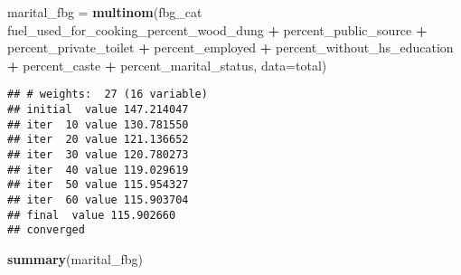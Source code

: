 \documentclass[]{article}
\newenvironment{Shaded}{\begin{snugshade}}{\end{snugshade}}
\newcommand{\DataTypeTok}[1]{\textcolor[rgb]{0.13,0.29,0.53}{#1}}
\newcommand{\KeywordTok}[1]{\textcolor[rgb]{0.13,0.29,0.53}{\textbf{#1}}}
\newcommand{\NormalTok}[1]{#1}
\newcommand{\OperatorTok}[1]{\textcolor[rgb]{0.81,0.36,0.00}{\textbf{#1}}}
\newcommand{\StringTok}[1]{\textcolor[rgb]{0.31,0.60,0.02}{#1}}
\begin{document}
\begin{Shaded}
\begin{Highlighting}[]
\NormalTok{marital_fbg =}\StringTok{ }
\StringTok{  }\KeywordTok{multinom}\NormalTok{(fbg_cat }\OperatorTok{~}\StringTok{ }\NormalTok{fuel_used_for_cooking_percent_wood_dung }\OperatorTok{+}\StringTok{ }\NormalTok{percent_public_source }\OperatorTok{+}\StringTok{ }\NormalTok{percent_private_toilet }\OperatorTok{+}\StringTok{ }\NormalTok{percent_employed }\OperatorTok{+}\StringTok{ }\NormalTok{percent_without_hs_education }\OperatorTok{+}\StringTok{ }\NormalTok{percent_caste }\OperatorTok{+}\StringTok{ }\NormalTok{percent_marital_status, }\DataTypeTok{data=}\NormalTok{total)}
\end{Highlighting}
\end{Shaded}

\begin{verbatim}
## # weights:  27 (16 variable)
## initial  value 147.214047 
## iter  10 value 130.781550
## iter  20 value 121.136652
## iter  30 value 120.780273
## iter  40 value 119.029619
## iter  50 value 115.954327
## iter  60 value 115.903704
## final  value 115.902660 
## converged
\end{verbatim}

\begin{Shaded}
\begin{Highlighting}[]
\KeywordTok{summary}\NormalTok{(marital_fbg)}
\end{Highlighting}
\end{Shaded}
\end{document}
